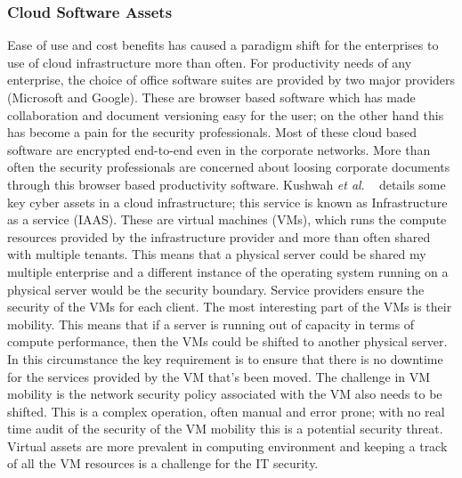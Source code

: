 \subsubsection{Cloud Software Assets}\label{sec:cloud_sw}
Ease of use and cost benefits has caused a paradigm shift for the enterprises to use of cloud infrastructure more than often. For productivity needs of any enterprise, the choice of office software suites are provided by two major providers (Microsoft and Google). These are browser based software which has made collaboration and document versioning easy for the user; on the other hand this has become a pain for the security professionals. Most of these cloud based software are encrypted end-to-end even in the corporate networks. More than often the security professionals are concerned about loosing corporate documents through this browser based productivity software. Kushwah \textit{et al}. ~\cite{7546222} details some key cyber assets in a cloud infrastructure; this service is known as Infrastructure as a service (IAAS). These are virtual machines (VMs), which runs the compute resources provided by the infrastructure provider and more than often shared with multiple tenants. This means that a physical server could be shared my multiple enterprise and a different instance of the operating system running on a physical server would be the security boundary. Service providers ensure the security of the VMs for each client. The most interesting part of the VMs is their mobility. This means that if a server is running out of capacity in terms of compute performance, then the VMs could be shifted to another physical server. In this circumstance the key requirement is to ensure that there is no downtime for the services provided by the VM that's been moved. The challenge in VM mobility is the network security policy associated with the VM also needs to be shifted. This is a complex operation, often manual and error prone; with no real time audit of the security of the VM mobility this is a potential security threat. Virtual assets are more prevalent in computing environment and keeping a track of all the VM resources is a challenge for the IT security. \\ 

